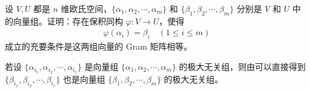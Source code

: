\documentclass[../../main.tex]{subfiles}%
\begin{document}
\begin{proposition}\label{proposition:例9.38}
设 \(V,U\) 都是 \(n\) 维欧氏空间，\(\{\alpha_1,\alpha_2,\cdots,\alpha_m\}\) 和 \(\{\beta_1,\beta_2,\cdots,\beta_m\}\) 分别是 \(V\) 和 \(U\) 中的向量组。证明：存在保积同构 \(\varphi:V \to U\)，使得
\begin{align*}
\varphi(\alpha_i) = \beta_i\quad (1\leqslant  i \leqslant  m)
\end{align*}
成立的充要条件是这两组向量的 Gram 矩阵相等。
\end{proposition}
\begin{remark}
若设 \(\{\alpha_{i_1},\alpha_{i_2},\cdots,\alpha_{i_r}\}\) 是向量组 \(\{\alpha_1,\alpha_2,\cdots,\alpha_m\}\) 的极大无关组，则由可以直接得到 \(\{\beta_{i_1},\beta_{i_2},\cdots,\beta_{i_r}\}\) 也是向量组 \(\{\beta_1,\beta_2,\cdots,\beta_m\}\) 的极大无关组。 
\end{remark}
\end{document}
